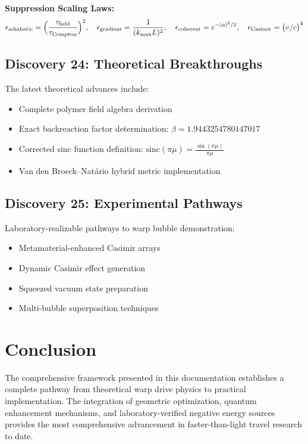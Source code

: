 \documentclass{article}
\begin{document}
\textbf{Suppression Scaling Laws:}
\[
  \epsilon_{\rm adiabatic} = \Bigl(\frac{\tau_{\rm field}}{\tau_{\rm Compton}}\Bigr)^2,\quad
  \epsilon_{\rm gradient} = \frac{1}{(k_{\max}L)^2},\quad
  \epsilon_{\rm coherent} = e^{-|\alpha|^2/2},\quad
  \epsilon_{\rm Casimir} = \bigl(v/c\bigr)^4
\]

\subsection{Discovery 24: Theoretical Breakthroughs}
The latest theoretical advances include:
\begin{itemize}
  \item Complete polymer field algebra derivation
  \item Exact backreaction factor determination: $\beta = 1.9443254780147017$
  \item Corrected sinc function definition: $\text{sinc}(\pi\mu) = \frac{\sin(\pi\mu)}{\pi\mu}$
  \item Van den Broeck–Natário hybrid metric implementation
\end{itemize}

\subsection{Discovery 25: Experimental Pathways}
Laboratory-realizable pathways to warp bubble demonstration:
\begin{itemize}
  \item Metamaterial-enhanced Casimir arrays
  \item Dynamic Casimir effect generation
  \item Squeezed vacuum state preparation
  \item Multi-bubble superposition techniques
\end{itemize}

\section{Conclusion}

The comprehensive framework presented in this documentation establishes a complete pathway from theoretical warp drive physics to practical implementation. The integration of geometric optimization, quantum enhancement mechanisms, and laboratory-verified negative energy sources provides the most comprehensive advancement in faster-than-light travel research to date.
\end{document}
